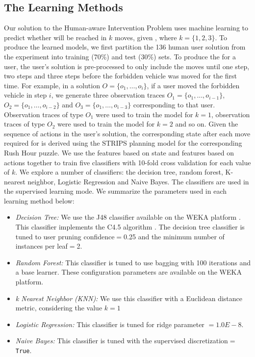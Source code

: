 \subsection{The Learning Methods}
Our solution to the Human-aware Intervention Problem uses machine learning to predict whether \undesired will be reached in $k$ moves, given \historyDef, where $k=\lbrace 1,2,3\rbrace$.
To produce the learned models, we first partition the 136 human user solution from the experiment into training (70\%) and test (30\%) sets. 
To produce the \historyDef for a user, the user's solution is pre-processed to only include the moves until one step, two steps and three steps before the forbidden vehicle was moved for the first time. 
For example, in a  solution $O=\lbrace o_1, \ldots, o_i\rbrace$, if a user moved the forbidden vehicle in step $i$, we generate three observation traces $O_1=\lbrace o_1, \ldots, o_{i-1}\rbrace$, $O_2=\lbrace o_1, \ldots, o_{i-2}\rbrace$ and $O_3=\lbrace o_1, \ldots, o_{i-3}\rbrace$ corresponding to that user. 
Observation traces of type $O_1$ were used to train the model for $k=1$, observation traces of type $O_2$ were used to train the model for $k=2$ and so on.
Given the sequence of actions in the user's solution, the corresponding state after each move required for \historyDef is derived using the STRIPS planning model for the corresponding Rush Hour puzzle.
We use the features based on state and features based on actions together to train five classifiers with 10-fold cross validation for each value of $k$. 
We explore a number of classifiers: the decision tree, random forest, K-nearest neighbor, Logistic Regression and Naive Bayes. 
The classifiers are used in the supervised learning mode. 
We summarize the parameters used in each learning method below:
\begin{itemize}
\item \textit{Decision Tree:} We use the J48 classifier available on the WEKA platform \cite{hall09}. This classifier implements the C4.5 algorithm \cite{quinlan1993c45}. The decision tree classifier is tuned to user pruning confidence$=$0.25 and the minimum number of instances per leaf$=$2.
\item \textit{Random Forest:} This classifier is tuned to use bagging with 100 iterations and a base learner. These configuration parameters are available on the WEKA platform. 
\item \textit{k Nearest Neighbor (KNN):} We use this classifier with a Euclidean distance metric, considering the value $k=1$
\item \textit{Logistic Regression:} This classifier is tuned for ridge parameter $= 1.0E-8$.
\item \textit{Naive Bayes:} This classifier is tuned with the supervised discretization$=$\texttt{True}.
\end{itemize}


